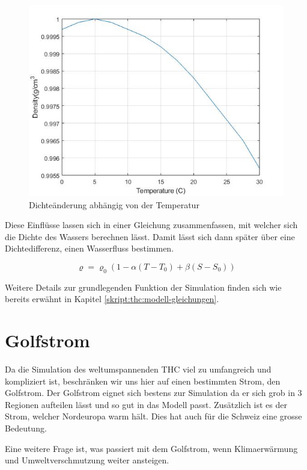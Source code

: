 \begin{figure}
	\centering
	\includegraphics[width=12cm]{thermohalin/Code/graphs/graph_temp.jpg}
	\caption{Dichteänderung abhängig von der Temperatur}
\end{figure}

 Diese Einflüsse lassen sich in einer Gleichung zusammenfassen, mit welcher sich die Dichte des Wassers berechnen lässt. Damit lässt sich dann später über eine Dichtedifferenz, einen Wasserfluss bestimmen.
 

\begin{equation}
\varrho
=
\varrho_0(1-\alpha(T-T_0)+\beta(S-S_0))
\label{skript:salinity-linear}
\end{equation} 

Weitere Details zur grundlegenden Funktion der Simulation finden sich wie bereits erwähnt in Kapitel \ref{skript:thc:modell-gleichungen}.


\section{Golfstrom}

Da die Simulation des weltumspannenden THC viel zu umfangreich und kompliziert ist, beschränken wir uns hier auf einen bestimmten Strom, den Golfstrom.
Der Golfstrom eignet sich bestens zur Simulation da er sich grob in 3 Regionen aufteilen lässt und so gut in das Modell passt. Zusätzlich ist es der Strom, welcher Nordeuropa warm hält.  Dies hat auch für die Schweiz eine grosse Bedeutung.

Eine weitere Frage ist, was passiert mit dem Golfstrom, wenn Klimaerwärmung und Umweltverschmutzung weiter ansteigen.

